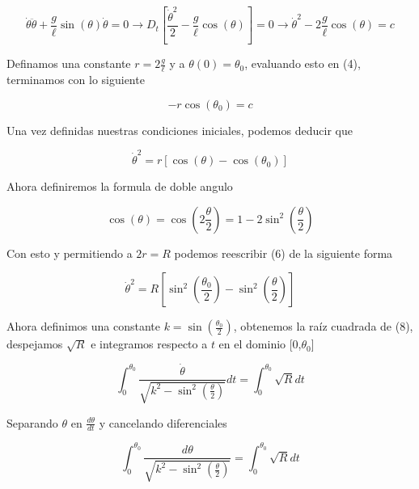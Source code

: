 \documentclass[]{article}
\begin{document}
	\begin{equation}
		\dot{\theta}\ddot{\theta}+\frac{g}{\ell}\sin(\theta)\dot{\theta} = 0 \rightarrow D_t\left[\frac{\dot{\theta}^2}{2}-\frac{g}{\ell}\cos(\theta)\right] = 0 \rightarrow \dot{\theta}^2-2\frac{g}{\ell}\cos(\theta) = c
	\end{equation}

	Definamos una constante $r = 2\frac{g}{\ell}$ y a $\theta(0) = \theta_0$, evaluando esto en (4), terminamos con lo siguiente
	
	\begin{equation}
		-r\cos(\theta_0) = c
	\end{equation}

	Una vez definidas nuestras condiciones iniciales, podemos deducir que
	
	\begin{equation}
		\dot{\theta}^2 = r\left[\cos(\theta) -\cos(\theta_0)\right]
	\end{equation}

	Ahora definiremos la formula de doble angulo
	
	\begin{equation}
		\cos(\theta) = \cos\left(2\frac{\theta}{2}\right) = 1-2\sin^2\left(\frac{\theta}{2}\right)
	\end{equation}

	Con esto y permitiendo a $2r = R$ podemos reescribir (6) de la siguiente forma
	
	\begin{equation}
		\dot{\theta}^2 = R\left[\sin^2\left(\frac{\theta_0}{2}\right)-\sin^2\left(\frac{\theta}{2}\right)\right]
	\end{equation}

	Ahora definimos una constante $k = \sin\left(\frac{\theta_0}{2}\right)$, obtenemos la raíz cuadrada de (8), despejamos $\sqrt{R}$ e integramos respecto a $t$ en el dominio [0,$\theta_0$]
	
	\begin{equation}
		\int^{\theta_0}_{0}\frac{\dot{\theta}}{\sqrt{k^2-\sin^2\left(\frac{\theta}{2}\right)}}dt = \int^{\theta_0}_{0}\sqrt{R}dt
	\end{equation}

	Separando $\theta$ en $\frac{d\theta}{dt}$ y cancelando diferenciales
	
	\begin{equation}
		\int^{\theta_0}_{0}\frac{d\theta}{\sqrt{k^2-\sin^2\left(\frac{\theta}{2}\right)}} = \int^{\theta_0}_{0}\sqrt{R}dt
	\end{equation}
\end{document}
